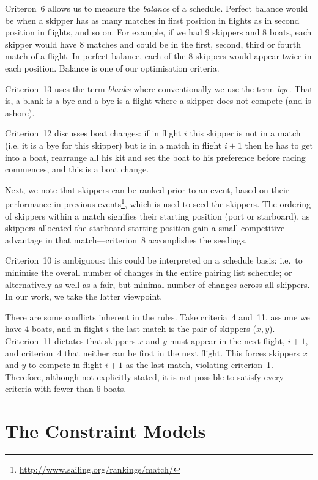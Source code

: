 \documentclass{llncs}
\begin{document}
Criteron~6 allows us to measure the \emph{balance} of a schedule. Perfect balance would be when a skipper has as many matches in first position in flights as in second position in flights, and so on. For example, if we had 9 skippers and 8 boats, each skipper would have 8 matches and could be in the first, second, third or fourth match of a flight. In perfect balance, each of the 8 skippers would appear twice in each position. Balance is one of our optimisation criteria.

Criterion~13 uses the term \emph{blanks} where conventionally we use the term \emph{bye}. That is, a blank is a bye and a bye is a flight where a skipper does not compete (and is ashore).

Criterion~12 discusses boat changes: if in flight $i$ this skipper is not in a match (i.e. it is a
bye for this skipper) but is in a match in flight $i+1$ then he has to get into a boat, rearrange
all his kit and set the boat to his preference before racing commences, and this is a boat change. 

Next, we note that skippers can be ranked prior to an event, based on their performance in
previous events\footnote{\url{http://www.sailing.org/rankings/match/}}, which is used to seed the
skippers. The ordering of skippers within a match signifies their starting position (port or
starboard), as skippers allocated the starboard starting position gain a small competitive
advantage in that match---criterion~8 accomplishes the seedings.

Criterion~10 is ambiguous: this could be interpreted on a schedule basis: i.e.\ to minimise the
overall number of changes in the entire pairing list schedule; or alternatively as well as a fair,
but minimal number of changes across all skippers. In our work, we take the latter viewpoint.

There are some conflicts inherent in the rules. Take criteria~4 and~11, assume we have 4 boats, and
in flight $i$ the last match is the pair of skippers ($x,y$). Criterion~11 dictates that skippers $x$
and $y$ must appear in the next flight, $i+1$, and criterion~4 that neither can be first in the next
flight. This forces skippers $x$ and $y$ to compete in flight $i+1$ as the last match, violating
criterion~1. Therefore, although not explicitly stated, it is not possible to satisfy every criteria
with fewer than 6 boats.

\section{The Constraint Models}\label{sec:models}
\end{document}
